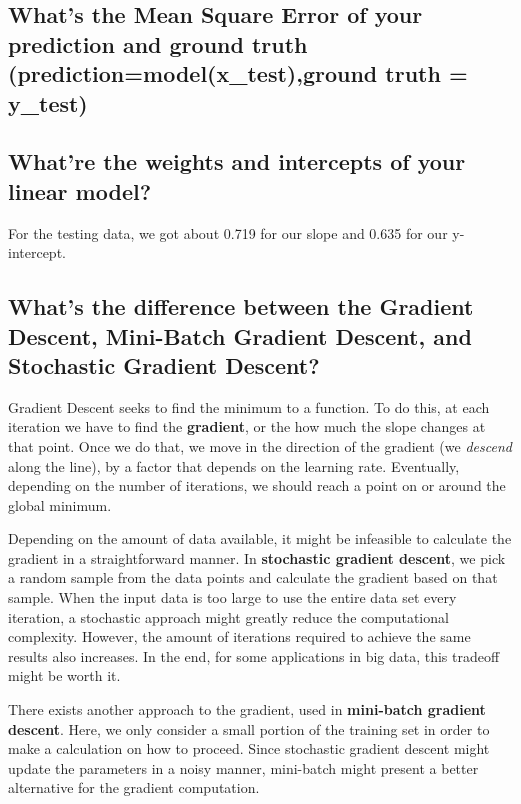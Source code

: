 \documentclass{article}
\begin{document}
		\subsection{What's the Mean Square Error of your prediction and ground truth
				(prediction=model(x\_test),ground truth = y\_test)}

		\subsection{What're the weights and intercepts of your linear model?}

				For the testing data, we got about 0.719 for our slope and 0.635 for our 
				y-intercept.

		\subsection{What's the difference between the Gradient Descent, Mini-Batch Gradient
				Descent, and Stochastic Gradient Descent?}
				
				Gradient Descent seeks to find the minimum to a function. To do this, at each 
				iteration we have to find the \textbf{gradient}, or the how much the slope changes
				at that point. Once we do that, we move in the direction of the gradient (we 
				\textit{descend} along the line), by a factor that depends on the learning rate.
				Eventually, depending on the number of iterations, we should reach a point 
				on or around the global minimum.

				Depending on the amount of data available, it might be infeasible to calculate
				the gradient in a straightforward manner. In \textbf{stochastic gradient descent},
				we pick a random sample from the data points and calculate the gradient based on that
				sample. When the input data is too large to use the entire data set every iteration,
				a stochastic approach might greatly reduce the computational complexity. However,
				the amount of iterations required to achieve the same results also increases. In the end,
				for some applications in big data, this tradeoff might be worth it.

				There exists another approach to the gradient, used in \textbf{mini-batch gradient descent}.
				Here, we only consider a small portion of the training set in  order to make a calculation
				on how to proceed. Since stochastic gradient descent might update the parameters in a noisy 
				manner, mini-batch might present a better alternative for the gradient computation.
\end{document}

